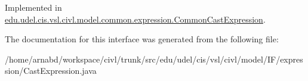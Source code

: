 Implemented in \hyperlink{classedu_1_1udel_1_1cis_1_1vsl_1_1civl_1_1model_1_1common_1_1expression_1_1CommonCastExpression_a58441ce5406645f1c3d292e0193aabf3}{edu.\+udel.\+cis.\+vsl.\+civl.\+model.\+common.\+expression.\+Common\+Cast\+Expression}.



The documentation for this interface was generated from the following file\+:\begin{DoxyCompactItemize}
\item 
/home/arnabd/workspace/civl/trunk/src/edu/udel/cis/vsl/civl/model/\+I\+F/expression/Cast\+Expression.\+java\end{DoxyCompactItemize}
